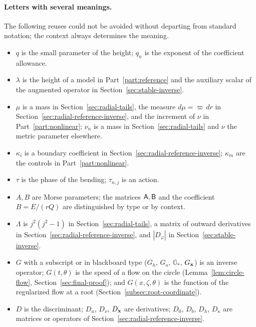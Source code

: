 \paragraph{Letters with several meanings.}
The following reuses could not be avoided without departing from
standard notation; the context always determines the meaning.
\begin{itemize}
\item $q$ is the small parameter of the height; $q_n$ is the exponent
 of the coefficient allowance.
\item $\lambda$ is the height of a model in Part~\ref{part:reference}
 and the auxiliary scalar of the augmented operator in
 Section~\ref{sec:stable-inverse}.
\item $\mu$ is a mass in Section~\ref{sec:radial-tails}, the measure
 $d\mu=\varpi\,dr$ in
 Section~\ref{sec:radial-reference-inverse}, and the increment of
 $\nu$ in Part~\ref{part:nonlinear}; $\nu_n$ is a mass in
 Section~\ref{sec:radial-tails} and $\nu$ the metric parameter
 elsewhere.
\item $\kappa_i$ is a boundary coefficient in
 Section~\ref{sec:radial-reference-inverse}; $\kappa_m$ are the
 controls in Part~\ref{part:nonlinear}.
\item $\tau$ is the phase of the bending; $\tau_{n,j}$ is an action.
\item $A,B$ are Morse parameters; the matrices $\mathsf A,\mathsf B$ and the
 coefficient $B=E/(rQ)$ are distinguished by type or by context.
\item $\Lambda$ is $j^2(j^2-1)$ in Section~\ref{sec:radial-tails}, a
 matrix of outward derivatives in
 Section~\ref{sec:radial-reference-inverse}, and $|D_\varphi|$ in
 Section~\ref{sec:stable-inverse}.
\item $G$ with a subscript or in blackboard type ($G_h$, $G_o$,
 $\mathbb G_*$, $G_{\mathbf x}$) is an inverse operator; $G(t,\theta)$ is
 the speed of a flow on the circle
 (Lemma~\ref{lem:circle-flow}, Section~\ref{sec:final-proof}); and
 $G(x,\zeta,\theta)$ is the function of the regularized flow at a
 root (Section~\ref{subsec:root-coordinate}).
\item $D$ is the discriminant; $D_u$, $D_\nu$, $D_{\mathbf x}$ are
 derivatives; $D_0$, $D_b$, $D_h$, $D_\kappa$ are matrices or
 operators of Section~\ref{sec:radial-reference-inverse}.
\end{itemize}
